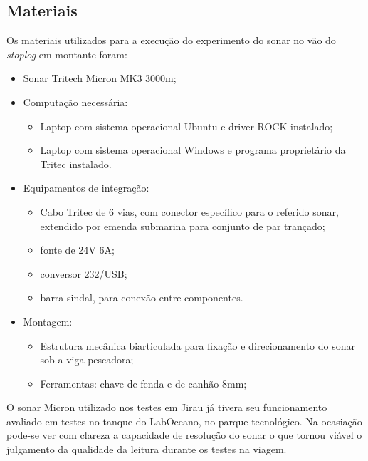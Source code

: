 


\subsection{Materiais}
\label{materials}
Os materiais utilizados para a execução do experimento do sonar no vão do
\emph{stoplog} em montante foram:
\begin{itemize}
  \item Sonar Tritech Micron MK3 3000m;
  
  \item Computação necessária:
  \begin{itemize}
    \item Laptop com sistema operacional Ubuntu e driver ROCK instalado;
    \item Laptop com sistema operacional Windows e programa proprietário da Tritec instalado.
  \end{itemize}
  
  \item Equipamentos de integração:
  \begin{itemize}
    \item Cabo Tritec de 6 vias, com conector específico para o referido sonar,
  extendido por emenda submarina para conjunto de par trançado;
    \item fonte de 24V 6A;
    \item conversor 232/USB;
    \item barra sindal, para conexão entre componentes.
  \end{itemize}
  
  \item Montagem:
  \begin{itemize}
    \item Estrutura mecânica biarticulada para fixação e direcionamento do sonar
  sob a viga pescadora;
    \item Ferramentas: chave de fenda e de canhão 8mm;
  \end{itemize}
\end{itemize}

O sonar Micron utilizado nos testes em Jirau já tivera seu funcionamento
avaliado em testes no tanque do LabOceano, no parque tecnológico. Na ocasiação
pode-se ver com clareza a capacidade de resolução do sonar o que tornou viável o
julgamento da qualidade da leitura durante os testes na viagem.

